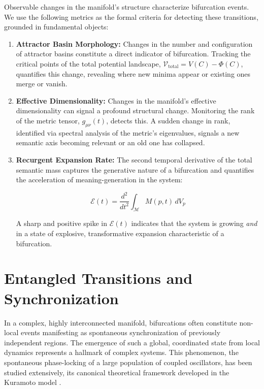 Observable changes in the manifold's structure characterize bifurcation events. We use the following metrics as the formal criteria for detecting these transitions, grounded in fundamental objects:

\begin{enumerate}

    \item \textbf{Attractor Basin Morphology:} Changes in the number and configuration of attractor basins constitute a direct indicator of bifurcation. Tracking the critical points of the total potential landscape, \(\mathcal{V}_{\text{total}} = V(C) - \Phi(C)\), quantifies this change, revealing where new minima appear or existing ones merge or vanish.
    
    \item \textbf{Effective Dimensionality:} Changes in the manifold's effective dimensionality can signal a profound structural change. Monitoring the rank of the metric tensor, \(g_{\mu\nu}(t)\), detects this. A sudden change in rank, identified via spectral analysis of the metric's eigenvalues, signals a new semantic axis becoming relevant or an old one has collapsed.
    
    \item \textbf{Recurgent Expansion Rate:} The second temporal derivative of the total semantic mass captures the generative nature of a bifurcation and quantifies the acceleration of meaning-generation in the system:

    \begin{equation}
    \mathcal{E}(t) = \frac{d^2}{dt^2}\int_{\mathcal{M}} M(p,t) \, dV_p
    \end{equation} 
    
    A sharp and positive spike in \(\mathcal{E}(t)\) indicates that the system is growing \textit{and} in a state of explosive, transformative expansion characteristic of a bifurcation.
    
\end{enumerate}


\section{Entangled Transitions and Synchronization}
\label{11.4:entangled_transitions_and_synchronization}

In a complex, highly interconnected manifold, bifurcations often constitute non-local events manifesting as spontaneous synchronization of previously independent regions. The emergence of such a global, coordinated state from local dynamics represents a hallmark of complex systems. This phenomenon, the spontaneous phase-locking of a large population of coupled oscillators, has been studied extensively, its canonical theoretical framework developed in the Kuramoto model \autocite{Kuramoto1975}.

